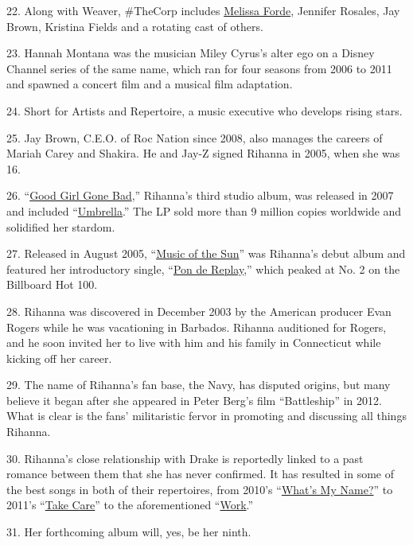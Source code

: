 22. Along with Weaver, \#TheCorp includes
\href{https://www.instagram.com/mdollas11/?hl=en}{Melissa Forde},
Jennifer Rosales, Jay Brown, Kristina Fields and a rotating cast of
others.

23. Hannah Montana was the musician Miley Cyrus's alter ego on a Disney
Channel series of the same name, which ran for four seasons from 2006 to
2011 and spawned a concert film and a musical film adaptation.

24. Short for Artists and Repertoire, a music executive who develops
rising stars.

25. Jay Brown, C.E.O. of Roc Nation since 2008, also manages the careers
of Mariah Carey and Shakira. He and Jay-Z signed Rihanna in 2005, when
she was 16.

26. ``\href{https://open.spotify.com/album/4OXnPSBtZo8PBFiTOfuumP}{Good
Girl Gone Bad},'' Rihanna's third studio album, was released in 2007 and
included
``\href{https://www.youtube.com/watch?v=CvBfHwUxHIk}{Umbrella}.'' The LP
sold more than 9 million copies worldwide and solidified her stardom.

27. Released in August 2005,
``\href{https://open.spotify.com/album/4FyGpObwABjn0o8Tdp7AZz}{Music of
the Sun}'' was Rihanna's debut album and featured her introductory
single, ``\href{https://www.youtube.com/watch?v=oEauWw9ZGrA}{Pon de
Replay},'' which peaked at No. 2 on the Billboard Hot 100.

28. Rihanna was discovered in December 2003 by the American producer
Evan Rogers while he was vacationing in Barbados. Rihanna auditioned for
Rogers, and he soon invited her to live with him and his family in
Connecticut while kicking off her career.

29. The name of Rihanna's fan base, the Navy, has disputed origins, but
many believe it began after she appeared in Peter Berg's film
``Battleship'' in 2012. What is clear is the fans' militaristic fervor
in promoting and discussing all things Rihanna.

30. Rihanna's close relationship with Drake is reportedly linked to a
past romance between them that she has never confirmed. It has resulted
in some of the best songs in both of their repertoires, from 2010's
``\href{https://www.youtube.com/watch?v=U0CGsw6h60k}{What's My Name?}''
to 2011's ``\href{https://www.youtube.com/watch?v=-zzP29emgpg}{Take
Care}'' to the aforementioned
``\href{https://www.youtube.com/watch?v=HL1UzIK-flA}{Work}.''

31. Her forthcoming album will, yes, be her ninth.

